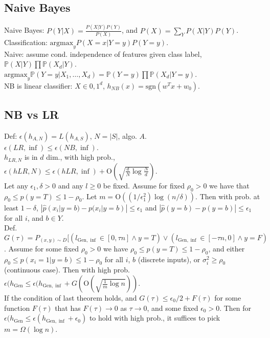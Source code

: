 \subsection*{Naive Bayes}

Naive Bayes: $P(Y|X)=\frac{P(X|Y)P(Y)}{P(X)}$, and $P(X) = \sum_Y P(X|Y)P(Y)$.\\
Classification: $\text{argmax}_y P(X=x|Y=y)P(Y=y)$.\\
Naive: assume cond. independence of features given class label, $\mathbb{P}(X|Y) \prod \mathbb{P}(X_d|Y)$.\\
$\text{argmax}_y \mathbb{P}(Y=y|X_1, \dots, X_d) = \mathbb{P}(Y=y) \prod \mathbb{P}(X_d|Y=y)$.\\
NB is linear classifier: $X \in {0, 1}^d$, $h_{NB}(x) = \text{sgn}(w^T x + w_0)$.

\subsection*{NB vs LR}

Def: $\epsilon(h_{A, N}) = L(h_{A, S})$, $N = |S|$, algo. $A$.\\
$\epsilon(LR, \inf) \leq \epsilon(NB, \inf)$.\\
$h_{LR, N}$ is in $d$ dim., with high prob., $\epsilon(h{LR, N}) \leq \epsilon(h{LR, \inf}) + \text{O}(\sqrt{\frac{d}{N}\log\frac{N}{d}})$.\\
Let any $\epsilon_1, \delta > 0$ and any $l \geq 0$ be fixed. Assume for fixed $\rho_0 > 0$ we have that $\rho_0 \leq p(y=T) \leq 1-\rho_0$. Let $m=\text{O}((1/\epsilon_1^2)\log(n/\delta))$. Then with prob. at least $1-\delta$, $|\hat{p}(x_i|y=b)-p(x_i|y=b)|\leq \epsilon_1$ and $|\hat{p}(y=b)-p(y=b)|\leq \epsilon_1$ for all $i$, and $b \in Y$.\\
Def. $G(\tau) = P_{(x, y) \sim D}[(l_{\text{Gen}, \inf}\in [0, \tau n]\wedge y=T) \vee (l_{\text{Gen}, \inf}\in [-\tau n, 0] \wedge y=F)$. Assume for some fixed $\rho_0 > 0$ we have $\rho_0 \leq p(y=T) \leq 1-\rho_0$, and either $\rho_0 \leq p(x_i=1|y=b) \leq 1-\rho_0$ for all $i$, $b$ (discrete inputs), or $\sigma_i^2 \geq \rho_0$ (continuous case). Then with high prob. $\epsilon(h_{\text{Gen}} \leq \epsilon(h_{\text{Gen}, \inf} + G(\text{O}(\sqrt{\frac{1}{m}\log n}))$.\\
If the condition of last theorem holds, and $G(\tau) \leq \epsilon_0 / 2 + F(\tau)$ for some function $F(\tau)$ that has $F(\tau) \rightarrow 0$ as $\tau \rightarrow 0$, and some fixed $\epsilon_0 > 0$. Then for $\epsilon(h_{\text{Gen}} \leq \epsilon(h_{\text{Gen}, \inf} + \epsilon_0)$ to hold with high prob., it suffices to pick $m = \Omega(\log n)$.

